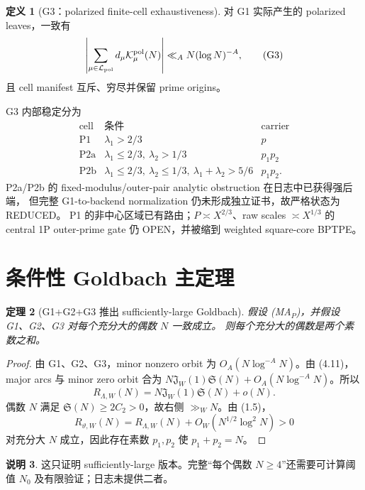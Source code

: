 \documentclass[11pt,a4paper]{ctexart}
\newtheorem{theorem}{定理}[section]
\theoremstyle{definition}
\newtheorem{definition}[theorem]{定义}
\newtheorem{remark}[theorem]{说明}
\newcommand{\1}{\mathbf 1}
\newcommand{\K}{\mathcal K}
\newcommand{\LL}{\mathcal L}
\newcommand{\OPEN}{\textcolor{red!70!black}{\textsf{OPEN}}}
\newcommand{\REDUCED}{\textcolor{orange!80!black}{\textsf{REDUCED}}}
\begin{document}
\begin{definition}[G3：polarized finite-cell exhaustiveness]
对 G1 实际产生的 polarized leaves，一致有
\[
\left|\sum_{\mu\in\LL_{\rm pol}}d_\mu
\K_\mu^{\rm pol}(N)\right|
\ll_A N(\log N)^{-A},                                  \tag{G3}
\]
且 cell manifest 互斥、穷尽并保留 prime origins。
\end{definition}

G3 内部稳定分为
\[
\begin{array}{c|c|c}
\text{cell}&\text{条件}&\text{carrier}\\ \hline
\mathrm{P1}&\lambda_1>2/3&p\\
\mathrm{P2a}&\lambda_1\le2/3,\ \lambda_2>1/3&p_1p_2\\
\mathrm{P2b}&\lambda_1\le2/3,\ \lambda_2\le1/3,
\ \lambda_1+\lambda_2>5/6&p_1p_2.
\end{array}                                             \tag{5.1}
\]
P2a/P2b 的 fixed-modulus/outer-pair analytic obstruction 在日志中已获得强后端，
但完整 G1-to-backend normalization 仍未形成独立证书，故严格状态为 \REDUCED。
P1 的非中心区域已有路由；$P\asymp X^{2/3}$、raw scales $\asymp X^{1/3}$
的 central 1P outer-prime gate 仍 \OPEN，并被缩到 weighted square-core BPTPE。

\section{条件性 Goldbach 主定理}

\begin{theorem}[G1+G2+G3 推出 sufficiently-large Goldbach]
假设 \textup{(MA$_P$)}，并假设 G1、G2、G3 对每个充分大的偶数 $N$ 一致成立。
则每个充分大的偶数是两个素数之和。
\end{theorem}

\begin{proof}
由 G1、G2、G3，minor nonzero orbit 为 $O_A(N\log^{-A}N)$。由 (4.11)，
major arcs 与 minor zero orbit 合为
$N\mathfrak J_W(1)\mathfrak S(N)+O_A(N\log^{-A}N)$。所以
\[
R_{\Lambda,W}(N)
=N\mathfrak J_W(1)\mathfrak S(N)+o(N).                 \tag{6.1}
\]
偶数 $N$ 满足 $\mathfrak S(N)\ge2C_2>0$，故右侧 $\gg_WN$。由 (1.5)，
\[
R_{\vartheta,W}(N)
=R_{\Lambda,W}(N)+O_W(N^{1/2}\log^2N)>0                \tag{6.2}
\]
对充分大 $N$ 成立，因此存在素数 $p_1,p_2$ 使 $p_1+p_2=N$。
\end{proof}

\begin{remark}
这只证明 sufficiently-large 版本。完整“每个偶数 $N\ge4$”还需要可计算阈值
$N_0$ 及有限验证；日志未提供二者。
\end{remark}
\end{document}
